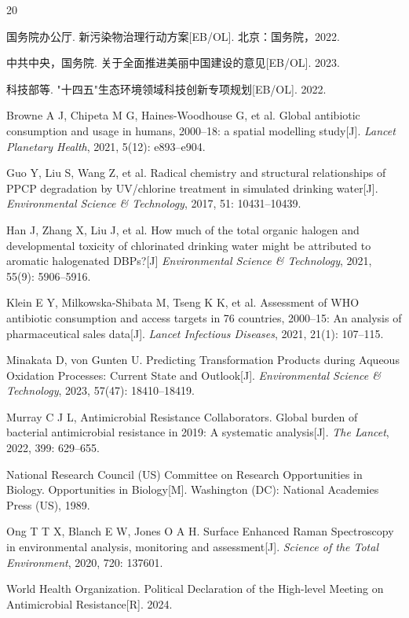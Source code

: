 \documentclass[12pt,a4paper]{article}
\begin{document}
\newpage
\begin{thebibliography}{20}

 国务院办公厅. 新污染物治理行动方案[EB/OL]. 北京：国务院，2022.

 中共中央，国务院. 关于全面推进美丽中国建设的意见[EB/OL]. 2023.

 科技部等. "十四五"生态环境领域科技创新专项规划[EB/OL]. 2022.

 Browne A J, Chipeta M G, Haines-Woodhouse G, et al. Global antibiotic consumption and usage in humans, 2000--18: a spatial modelling study[J]. \textit{Lancet Planetary Health}, 2021, 5(12): e893--e904.

 Guo Y, Liu S, Wang Z, et al. Radical chemistry and structural relationships of PPCP degradation by UV/chlorine treatment in simulated drinking water[J]. \textit{Environmental Science \& Technology}, 2017, 51: 10431--10439.

 Han J, Zhang X, Liu J, et al. How much of the total organic halogen and developmental toxicity of chlorinated drinking water might be attributed to aromatic halogenated DBPs?[J] \textit{Environmental Science \& Technology}, 2021, 55(9): 5906--5916.

 Klein E Y, Milkowska-Shibata M, Tseng K K, et al. Assessment of WHO antibiotic consumption and access targets in 76 countries, 2000--15: An analysis of pharmaceutical sales data[J]. \textit{Lancet Infectious Diseases}, 2021, 21(1): 107--115.

 Minakata D, von Gunten U. Predicting Transformation Products during Aqueous Oxidation Processes: Current State and Outlook[J]. \textit{Environmental Science \& Technology}, 2023, 57(47): 18410--18419.

 Murray C J L, Antimicrobial Resistance Collaborators. Global burden of bacterial antimicrobial resistance in 2019: A systematic analysis[J]. \textit{The Lancet}, 2022, 399: 629--655.

 National Research Council (US) Committee on Research Opportunities in Biology. Opportunities in Biology[M]. Washington (DC): National Academies Press (US), 1989.

 Ong T T X, Blanch E W, Jones O A H. Surface Enhanced Raman Spectroscopy in environmental analysis, monitoring and assessment[J]. \textit{Science of the Total Environment}, 2020, 720: 137601.

 World Health Organization. Political Declaration of the High-level Meeting on Antimicrobial Resistance[R]. 2024.


\end{thebibliography}
\end{document}
